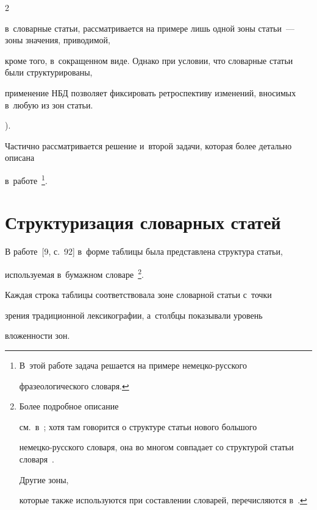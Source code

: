 \begin{multicols}{2}
{в~словарные статьи, рассматривается на примере лишь одной зоны статьи~--- зоны значения, приводимой, 


кроме того, в~сокращенном виде. Однако при условии, что словарные статьи были структурированы, 


применение НБД позволяет фиксировать ретроспективу изменений, вносимых в~любую из зон статьи.}). 


Частично рассматривается решение и~второй задачи, которая более детально описана  


в~работе~\cite{4-gz}\footnote{В~этой работе задача решается на примере немецко-русского 


фразеологического словаря.}.








\vspace*{-6pt}


  


\section{Структуризация словарных статей}





\vspace*{-3pt}





  В работе~[9, с.~92] в~форме таблицы была пред\-став\-ле\-на структура статьи, 


используемая в~бумажном словаре~\cite{5-gz}\footnote{Более подробное описание 


см.\ в~\cite[с.~40--44]{10-gz}; хотя там говорится о структуре статьи нового большого 


не\-мец\-ко-рус\-ско\-го словаря, она во многом совпадает со структурой статьи словаря~\cite{5-gz}. 


Другие зоны, 


которые также используются при составлении словарей, перечисляются в~\cite{11-gz}.}. 


Каждая строка таблицы соответствовала зоне словарной статьи с~точки 


зрения традици\-он\-ной лексикографии, а~столбцы показывали уровень 


вложенности зон. 






\end{multicols}
